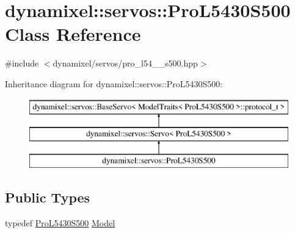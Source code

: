 \hypertarget{classdynamixel_1_1servos_1_1_pro_l5430_s500}{}\section{dynamixel\+:\+:servos\+:\+:Pro\+L5430\+S500 Class Reference}
\label{classdynamixel_1_1servos_1_1_pro_l5430_s500}


{\ttfamily \#include $<$dynamixel/servos/pro\+\_\+l54\+\_\+\_\+s500.\+hpp$>$}

Inheritance diagram for dynamixel\+:\+:servos\+:\+:Pro\+L5430\+S500\+:\begin{figure}[H]
\begin{center}
\leavevmode
\includegraphics[height=3.000000cm]{classdynamixel_1_1servos_1_1_pro_l5430_s500}
\end{center}
\end{figure}
\subsection*{Public Types}
\begin{DoxyCompactItemize}
\item 
typedef \hyperlink{classdynamixel_1_1servos_1_1_pro_l5430_s500}{Pro\+L5430\+S500} \hyperlink{classdynamixel_1_1servos_1_1_pro_l5430_s500_a052ba40fe97dc04d30c779e54d034b4a}{Model}
\end{DoxyCompactItemize}
